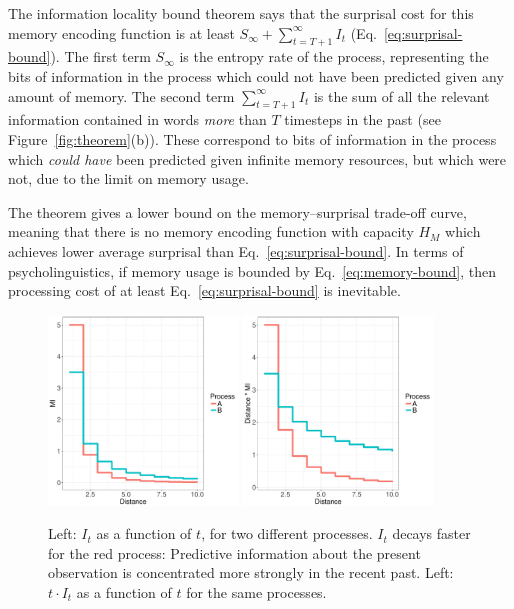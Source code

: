 The information locality bound theorem says that the surprisal cost for this memory encoding function is at least $S_\infty + \sum_{t=T+1}^\infty I_t$ (Eq.~\ref{eq:surprisal-bound}). The first term $S_\infty$ is the entropy rate of the process, representing the bits of information in the process which could not have been predicted given any amount of memory. The second term $\sum_{t=T+1}^\infty I_t$ is the sum of all the relevant information contained in words \emph{more} than $T$ timesteps in the past (see Figure~\ref{fig:theorem}(b)). These correspond to bits of information in the process which \emph{could have} been predicted given infinite memory resources, but which were not, due to the limit on memory usage.

The theorem gives a lower bound on the memory--surprisal trade-off curve, meaning that there is no memory encoding function with capacity $H_M$ which achieves lower average surprisal than Eq.~\ref{eq:surprisal-bound}. In terms of psycholinguistics, if memory usage is bounded by Eq.~\ref{eq:memory-bound}, then processing cost of at least Eq.~\ref{eq:surprisal-bound} is inevitable.

\begin{figure}
\includegraphics[width=0.45\textwidth]{figures/decay.pdf}
\includegraphics[width=0.45\textwidth]{figures/memory.pdf}
%
	\caption{Left: $I_t$ as a function of $t$, for two different processes. $I_t$ decays faster for the red process: Predictive information about the present observation is concentrated more strongly in the recent past. Left: $t \cdot I_t$ as a function of $t$ for the same processes. }\label{fig:basic}
\end{figure}

